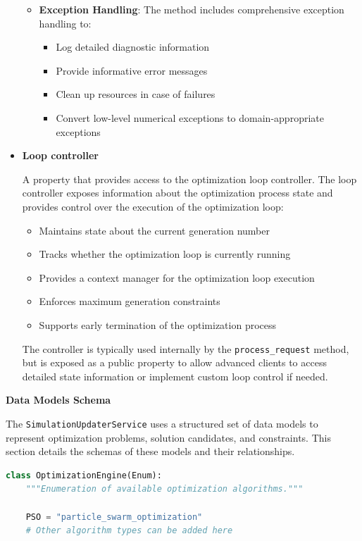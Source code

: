 \begin{itemize}
\begin{itemize}
		\item \textbf{Exception Handling}: The method includes comprehensive exception handling to:
		\begin{itemize}
			\item Log detailed diagnostic information
			\item Provide informative error messages
			\item Clean up resources in case of failures
			\item Convert low-level numerical exceptions to domain-appropriate exceptions
		\end{itemize}
	\end{itemize}

	\item \textbf{Loop controller}

	A property that provides access to the optimization loop controller. The loop controller exposes information about the optimization process state and provides control over the execution of the optimization loop:

	\begin{itemize}
		\item Maintains state about the current generation number
		\item Tracks whether the optimization loop is currently running
		\item Provides a context manager for the optimization loop execution
		\item Enforces maximum generation constraints
		\item Supports early termination of the optimization process
	\end{itemize}

	The controller is typically used internally by the \texttt{process\_request} method, but is exposed as a public property to allow advanced clients to access detailed state information or implement custom loop control if needed.

\end{itemize}

\textbf{Data Models Schema}

The \texttt{SimulationUpdaterService} uses a structured set of data models to represent optimization problems, solution candidates, and constraints. This section details the schemas of these models and their relationships.

\begin{lstlisting}[language=Python, caption={OptimizationEngine enumeration definition}]
	class OptimizationEngine(Enum):
	"""Enumeration of available optimization algorithms."""

	PSO = "particle_swarm_optimization"
	# Other algorithm types can be added here
\end{lstlisting}

